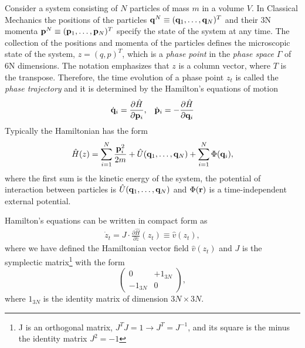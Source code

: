 \documentclass[b5paper,openright,10pt]{book}
\begin{document}
Consider a system consisting of $N$ particles of mass $m$ in a volume $V$. 
In Classical Mechanics the positions of the particles ${\bf q}^N\equiv ({\bf q}_1,\dots,{\bf q}_N)^T$ and their 3N momenta ${\bf p}^N\equiv ({\bf p}_1,\dots,{\bf p}_N)^T$ specify the state of the system at any time. 
The collection of the positions and momenta of the particles defines the microscopic state of the system, $z=(q,p)^T$, which is a {\it phase point} in the {\it phase space} $\Gamma$ of 6N dimensions. 
The notation emphasizes that $z$ is a column vector, where $T$ is the transpose. 
Therefore, the time evolution of a phase point $z_t$ is called the {\it phase trajectory} and it is determined by the Hamilton's equations of motion
%
\begin{align}
  \dot{{\bf q}}_i = \frac{\partial \hat{H}}{\partial {\bf p}_i}&,& \dot{{\bf p}}_i = -\frac{\partial \hat{H}}{\partial {\bf q}_i}
  \label{Hamiltonequation}
\end{align}
%
Typically the Hamiltonian has the form
%
\begin{align}
    \hat{H}(z) = \sum_{i=1}^{N}\frac{{\bf p}_i^2}{2m}+\hat{U}({\bf q}_1,\dots,{\bf q}_N)+\sum_{i=1}^{N}\Phi({\bf q}_i),
\end{align}
%
where the first sum is the kinetic energy of the system, the potential of interaction
between particles is $\hat{U}({\bf q}_1,\dots,{\bf q}_N)$ and $\Phi({\bf r})$ is a time-independent external potential. 


Hamilton's equations can be written in compact form as
%
\begin{align}
  \dot{z}_t = J\cdot\frac{\partial\hat{H}}{\partial{z}}(z_t)\equiv \hat{v}(z_t),
  \label{compactHamiltonEq}
\end{align}
%
where we have defined the Hamiltonian vector field $\hat{v}(z_t)$ and $J$ is the symplectic matrix\footnote{J is an orthogonal matrix, $J^TJ=1\to J^T = J^{-1}$, and its square is the minus the identity matrix $J^2=-1$} with the form
$$
\begin{pmatrix} 
  0 & +1_{3N} \\
  -1_{3N} & 0 
\end{pmatrix},
$$
where $1_{3N}$ is the identity matrix of dimension $3N \times 3N$.
\end{document}
